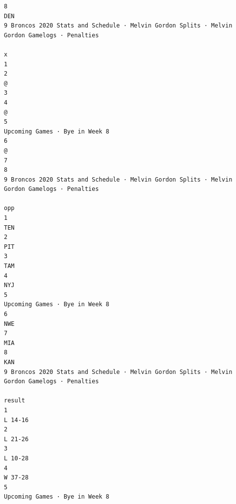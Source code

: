 \documentclass[
]{article}
\begin{document}
\begin{verbatim}
8                                                                                         DEN
9 Broncos 2020 Stats and Schedule · Melvin Gordon Splits · Melvin Gordon Gamelogs · Penalties
                                                                                            x
1                                                                                            
2                                                                                           @
3                                                                                            
4                                                                                           @
5                                                              Upcoming Games · Bye in Week 8
6                                                                                           @
7                                                                                            
8                                                                                            
9 Broncos 2020 Stats and Schedule · Melvin Gordon Splits · Melvin Gordon Gamelogs · Penalties
                                                                                          opp
1                                                                                         TEN
2                                                                                         PIT
3                                                                                         TAM
4                                                                                         NYJ
5                                                              Upcoming Games · Bye in Week 8
6                                                                                         NWE
7                                                                                         MIA
8                                                                                         KAN
9 Broncos 2020 Stats and Schedule · Melvin Gordon Splits · Melvin Gordon Gamelogs · Penalties
                                                                                       result
1                                                                                     L 14-16
2                                                                                     L 21-26
3                                                                                     L 10-28
4                                                                                     W 37-28
5                                                              Upcoming Games · Bye in Week 8

\end{verbatim}
\end{document}
